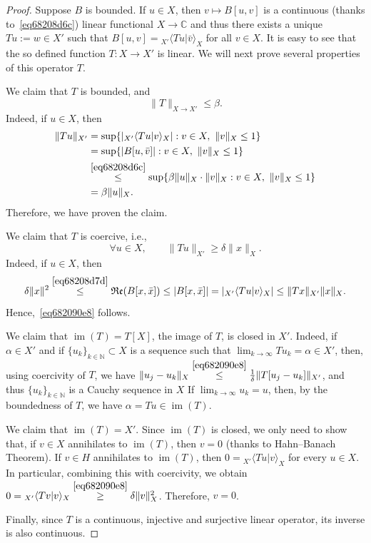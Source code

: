 \documentclass[a4paper,9pt]{amsart}
\newcommand{\frk}[1]{\mathfrak{#1}}
\newcommand{\N}{\mathbb{N}}	%
\newcommand{\C}{\mathbb{C}}	%
\newcommand{\real}{\frk{Re}}
\newcommand{\im}{\operatorname{im}}
\theoremstyle{plain}
\theoremstyle{definition}
\theoremstyle{remark}
\begin{document}
\begin{proof}
	Suppose $B$ is bounded.
	If $u\in X$, then $v\mapsto B[u,v]$ is a continuous (thanks to~\eqref{eq68208d6c}) linear functional $X\to\C$ and thus there exists a unique $Tu:=w\in X'$ such that $B[u,v] = {}_{X'}{\langle} Tu|\bar v \rangle_X$ for all $v\in X$.
	It is easy to see that the so defined function $T:X\to X'$ is linear.
	We will next prove several properties of this operator $T$.
	
	We claim that $T$ is bounded, and
	\begin{equation}\label{eq68219abb}
		\|T\|_{X\to X'} \le \beta .
	\end{equation}
	Indeed, if $u\in X$, then
	\begin{align}
		\|Tu\|_{X'}
		&= \sup\{ |{}_{X'}{\langle} Tu|v \rangle_X| : v\in X,\ \|v\|_X\le 1\} \\
		&= \sup\{ |B[u,\bar v]| : v\in X,\ \|v\|_X\le 1\} \\
		&\overset{\eqref{eq68208d6c}}\le \sup\{\beta \|u\|_X \cdot \|v\|_X : v\in X,\ \|v\|_X\le 1\} \\
		&= \beta \|u\|_X .
	\end{align}
	Therefore, we have proven the claim.
	
	We claim that $T$ is coercive, i.e., 
	\begin{equation}\label{eq682090e8}
		\forall u\in X,\qquad
		\|Tu\|_{X'} \ge \delta \|x\|_X .
	\end{equation}
	Indeed, if $u\in X$, then 
	\begin{equation}
		\delta \|x\|^2 
		\overset{\eqref{eq68208d7d}}\le \real(B[x,\bar x])
		\le |B[x,\bar x]|
		= |{}_{X'}{\langle} Tu|v \rangle_X|
		\le \|Tx\|_{X'} \|x\|_X .
	\end{equation}
	Hence,~\eqref{eq682090e8} follows.

	
	We claim that $\im(T)=T[X]$, the image of $T$, is closed in $X'$.
	Indeed, if $\alpha\in X'$ and if $\{u_k\}_{k\in\N}\subset X$ is a sequence such that $\lim_{k\to\infty} Tu_k = \alpha\in X'$, then, using coercivity of $T$, we have
	$\|u_j-u_k\|_X 
	\overset{\eqref{eq682090e8}}\le \frac1\delta \|T[u_j-u_k]\|_{X'}$,
	and thus $\{u_k\}_{k\in\N}$ is a Cauchy sequence in $X$
	If $\lim_{k\to\infty} u_k=u$, then, by the boundedness of $T$, we have $\alpha=Tu\in \im(T)$.
	
	We claim that $\im(T)=X'$.
	Since $\im(T)$ is closed, we only need to show that, if $v\in X$ annihilates to $\im(T)$, then $v=0$ 
	(thanks to Hahn--Banach Theorem).
	If $v\in H$ annihilates to $\im(T)$,
	then $0 = {}_{X'}{\langle} Tu|v \rangle_X$ for every $u\in X$.
	In particular, combining this with coercivity,
	we obtain $0 = {}_{X'}{\langle} Tv|v \rangle_X \overset{\eqref{eq682090e8}}\ge \delta\|v\|_X^2$.
	Therefore, $v=0$.
	
	Finally, since $T$ is a continuous, injective and surjective linear operator, its inverse is also continuous.
\end{proof}
\end{document}
